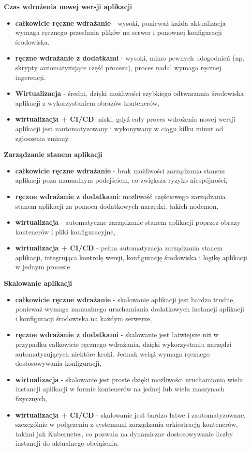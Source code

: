 \documentclass{article}
\begin{document}
\textbf{Czas wdrożenia nowej wersji aplikacji}
\begin{itemize}
    \item \textbf{całkowicie ręczne wdrażanie} - wysoki, ponieważ każda aktualizacja wymaga ręcznego przesłania plików na serwer i ponownej konfiguracji środowiska.
    \item \textbf{ręczne wdrażanie z dodatkami} - wysoki, mimo pewnych udogodnień (np. skrypty automatyzujące część procesu), proces nadal wymaga ręcznej ingerencji.
    \item \textbf{Wirtualizacja} - średni, dzięki możliwości szybkiego odtwarzania środowiska aplikacji z wykorzystaniem obrazów kontenerów,
    \item \textbf{wirtualizacja + CI/CD}: niski, gdyż cały proces wdrożenia nowej wersji aplikacji jest zautomatyzowany i wykonywany w ciągu kilku minut od zgłoszenia zmiany.
\end{itemize}

\textbf{Zarządzanie stanem aplikacji}
\begin{itemize}
    \item \textbf{całkowicie ręczne wdrażanie} - brak możliwości zarządzania stanem aplikacji poza manualnym podejściem, co zwiększa ryzyko niespójności,
    \item \textbf{ręczne wdrażanie z dodatkami}: możliwość częściowego zarządzania stanem aplikacji za pomocą dodatkowych narzędzi, takich nodemon,
    \item \textbf{wirtualizacja} - automatyczne zarządzanie stanem aplikacji poprzez obrazy kontenerów i pliki konfiguracyjne,
    \item \textbf{wirtualizacja + CI/CD} - pełna automatyzacja zarządzania stanem aplikacji, integrująca kontrolę wersji, konfigurację środowiska i logikę aplikacji w jednym procesie.
\end{itemize}

\textbf{Skalowanie aplikacji}
\begin{itemize}
    \item \textbf{całkowicie ręczne wdrażanie} - skalowanie aplikacji jest bardzo trudne, ponieważ wymaga manualnego uruchamiania dodatkowych instancji aplikacji i konfiguracji środowiska na każdym serwerze,
    \item \textbf{ręczne wdrażanie z dodatkami} - skalowanie jest łatwiejsze niż w przypadku całkowicie ręcznego wdrażania, dzięki wykorzystaniu narzędzi automatyzujących niektóre kroki. Jednak wciąż wymaga ręcznego dostosowywania konfiguracji,
    \item \textbf{wirtualizacja} - skalowanie jest proste dzięki możliwości uruchamiania wielu instancji aplikacji w formie kontenerów na jednej lub wielu maszynach fizycznych,
    \item \textbf{wirtualizacja + CI/CD} - skalowanie jest bardzo łatwe i zautomatyzowane, szczególnie w połączeniu z systemami zarządzania orkiestracją kontenerów, takimi jak Kubernetes, co pozwala na dynamiczne dostosowywanie liczby instancji do aktualnego obciążenia.
\end{itemize}
\end{document}

